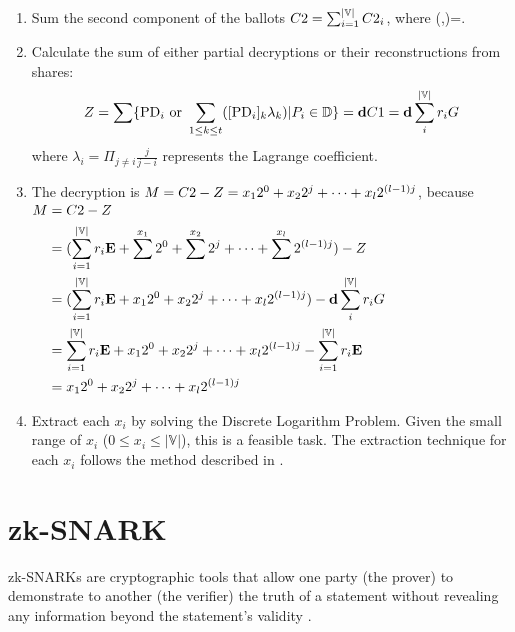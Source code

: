 \documentclass[runningheads]{llncs}
\begin{document}
\begin{enumerate}
    \item Sum the second component of the ballots $C2 = \sum_{i=1}^{|\mathbb{V}|} C2_{i}$, where (,)=.
    
    \item Calculate the sum of either partial decryptions or their reconstructions from shares: \[Z = \sum\{\mathrm{PD}_{i} \textrm{ or } \sum_{1 \leq k \leq t}([\mathrm{PD}_{i}]_{k} \lambda_{k}) | P_{i} \in \mathbb{D}\} = \textbf{d}{} C1 = \mathbf{d} \sum_i^{|\mathbb{V}|} r_i G \] where $\lambda_{i}=\Pi_{j \neq i}\frac{j}{j-i}$ represents the Lagrange coefficient.

    \item The decryption is $M=C2{} - Z=x_1 2^0 + x_2 2^j + \dots + x_l 2^{(l-1)j}$, because $\begin{aligned} M&=C2-Z \\
        &= (\sum_{i=1}^{|\mathbb{V}|} r_{i} \mathbf{E} + \sum^{x_1} 2^0 + \sum^{x_2} 2^j + \dots + \sum^{x_l} 2^{(l-1)j}) - Z\\
        &= (\sum_{i=1}^{|\mathbb{V}|} r_{i} \mathbf{E} + x_1 2^0 + x_2 2^j + \dots + x_l 2^{(l-1)j}) - \mathbf{d} \sum_i^{|\mathbb{V}|{}} r_i G \\
        &= \sum_{i=1}^{|\mathbb{V}|} r_{i} \mathbf{E} + x_1 2^0 + x_2 2^j + \dots + x_l 2^{(l-1)j} - \sum_{i=1}^{|\mathbb{V}|} r_{i} \mathbf{E}\\
        &= x_1 2^0 + x_2 2^j + \dots + x_l 2^{(l-1)j}\\
        \end{aligned}$
    
    \item Extract each $x_i$ by solving the Discrete Logarithm Problem. Given the small range of $x_i$ ($0 \leq x_i \leq |\mathbb{V}|$), this is a feasible task. The extraction technique for each $x_i$ follows the method described in \cite{haoAnonymousVotingTworound2010}.
\end{enumerate}



\section{zk-SNARK}

zk-SNARKs are cryptographic tools that allow one party (the prover) to demonstrate to another (the verifier) the truth of a statement without revealing any information beyond the statement's validity \cite{grothSizePairingbasedNoninteractive2016}.
\end{document}
